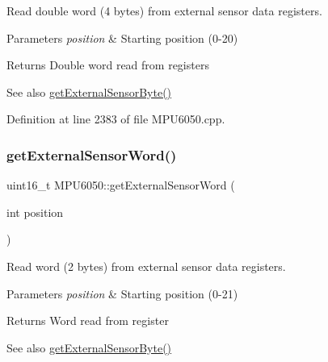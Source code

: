 Read double word (4 bytes) from external sensor data registers. 
\begin{DoxyParams}{Parameters}
{\em position} & Starting position (0-\/20) \\
\hline
\end{DoxyParams}
\begin{DoxyReturn}{Returns}
Double word read from registers 
\end{DoxyReturn}
\begin{DoxySeeAlso}{See also}
\mbox{\hyperlink{classMPU6050_a7f786ab4264f40e5a95e8937ec9adcc2}{get\+External\+Sensor\+Byte()}} 
\end{DoxySeeAlso}


Definition at line 2383 of file M\+P\+U6050.\+cpp.


\begin{DoxyCode}{0}

\end{DoxyCode}
\mbox{\label{classMPU6050_aaee15e48af7ba78660b5754f3bb5f37a}} 
\subsubsection{\texorpdfstring{getExternalSensorWord()}{getExternalSensorWord()}}
{\footnotesize\ttfamily uint16\+\_\+t M\+P\+U6050\+::get\+External\+Sensor\+Word (\begin{DoxyParamCaption}\item[{int}]{position }\end{DoxyParamCaption})}

Read word (2 bytes) from external sensor data registers. 
\begin{DoxyParams}{Parameters}
{\em position} & Starting position (0-\/21) \\
\hline
\end{DoxyParams}
\begin{DoxyReturn}{Returns}
Word read from register 
\end{DoxyReturn}
\begin{DoxySeeAlso}{See also}
\mbox{\hyperlink{classMPU6050_a7f786ab4264f40e5a95e8937ec9adcc2}{get\+External\+Sensor\+Byte()}} 
\end{DoxySeeAlso}


